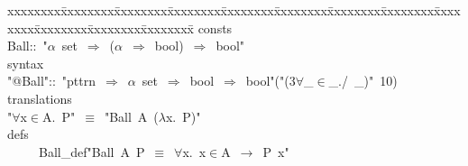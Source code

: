 
{\isamode
\begin{tabbing}
xxxxxxxx\=xxxxxxxx\=xxxxxxxx\=xxxxxxxx\=xxxxxxxx\=xxxxxxxx\=xxxxxxxx\=xxxxxxxx\=xxxxxxxx\=xxxxxxxx\=xxxxxxxx\=xxxxxxxx\=\kill{}\hspace{-1ex}
consts\\
\>Ball\>::\ "\mbox{$\alpha$}\ set\ \mbox{$\Rightarrow$}\ (\mbox{$\alpha$}\ \mbox{$\Rightarrow$}\ bool)\ \mbox{$\Rightarrow$}\ bool"\\
syntax\\
\>"@Ball"\>::\ "pttrn\ \mbox{$\Rightarrow$}\ \mbox{$\alpha$}\ set\ \mbox{$\Rightarrow$}\ bool\ \mbox{$\Rightarrow$}\ bool"\>\>\>\>\>("(3\mbox{$\forall$}\_\mbox{$\in$}\_./\ \_)"\ 10)\\
translations\\
\>\>"\mbox{$\forall$}x\mbox{$\in$}A.\ P"\ \mbox{$\equiv$}\ "Ball\ A\ (\mbox{$\lambda$}x.\ P)"\\
defs\\
\ \ \ \ \ Ball\_def\>\>"Ball\ A\ P\ \mbox{$\equiv$}\ \mbox{$\forall$}x.\ x\mbox{$\in$}A\ \mbox{$\longrightarrow$}\ P\ x"\\
\\

\end{tabbing}}

